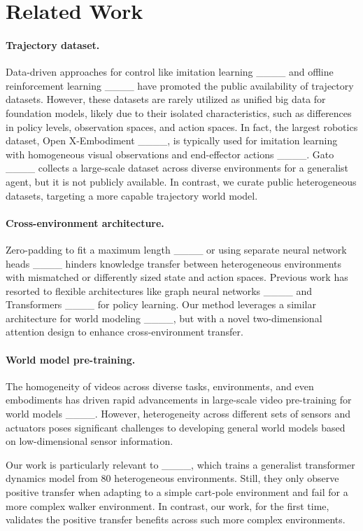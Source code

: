 \section{Related Work}
\paragraph{Trajectory dataset.} Data-driven approaches for control like imitation learning ____ and offline reinforcement learning ____ have promoted the public availability of trajectory datasets. However, these datasets are rarely utilized as unified big data for foundation models, likely due to their isolated characteristics, such as differences in policy levels, observation spaces, and action spaces. In fact, the largest robotics dataset, Open X-Embodiment ____, is typically used for imitation learning with homogeneous visual observations and end-effector actions ____. Gato ____ collects a large-scale dataset across diverse environments for a generalist agent, but it is not publicly available. In contrast, we curate public heterogeneous datasets, targeting a more capable trajectory world model.

\paragraph{Cross-environment architecture.} Zero-padding to fit a maximum length ____ or using separate neural network heads ____ hinders knowledge transfer between heterogeneous environments with mismatched or differently sized state and action spaces. Previous work has resorted to flexible architectures like graph neural networks ____ and Transformers ____ for policy learning. Our method leverages a similar architecture for world modeling ____, but with a novel two-dimensional attention design to enhance cross-environment transfer.

\paragraph{World model pre-training.} The homogeneity of videos across diverse tasks, environments, and even embodiments has driven rapid advancements in large-scale video pre-training for world models ____. However, heterogeneity across different sets of sensors and actuators poses significant challenges to developing general world models based on low-dimensional sensor information.

Our work is particularly relevant to ____, which trains a generalist transformer dynamics model from 80 heterogeneous environments. Still, they only observe positive transfer when adapting to a simple cart-pole environment and fail for a more complex walker environment. In contrast, our work, for the first time, validates the positive transfer benefits across such more complex environments.